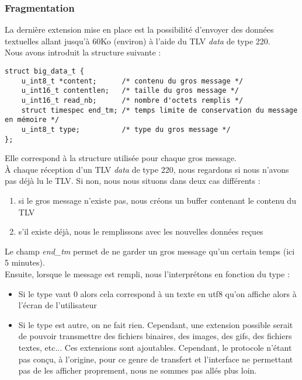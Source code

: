 \documentclass{FR16}
\begin{document}
\subsubsection{Fragmentation}
La dernière extension mise en place est la possibilité d'envoyer des données textuelles allant jusqu'à 60Ko (environ) à l'aide du TLV \textit{data} de type 220.\\
Nous avons introduit la structure suivante :
\begin{verbatim}
struct big_data_t {
    u_int8_t *content;      /* contenu du gros message */
    u_int16_t contentlen;   /* taille du gros message */
    u_int16_t read_nb;      /* nombre d'octets remplis */
    struct timespec end_tm; /* temps limite de conservation du message en mémoire */
    u_int8_t type;          /* type du gros message */
};
\end{verbatim}
Elle correspond à la structure utilisée pour chaque gros message.\\
À chaque réception d'un TLV \textit{data} de type 220, nous regardons si nous n'avons pas déjà lu le TLV. Si non, nous nous situons dans deux cas différents :
\begin{enumerate}
    \item si le gros message n'existe pas, nous créons un buffer contenant le contenu du TLV
    \item s'il existe déjà, nous le remplissons avec les nouvelles données reçues
\end{enumerate}
Le champ \textit{end\_tm} permet de ne garder un gros message qu'un certain temps (ici 5 minutes).\\
Ensuite, lorsque le message est rempli, nous l'interprétons en fonction du type :
\begin{itemize}
    \item Si le type vaut 0 alors cela correspond à un texte en utf8 qu'on affiche alors à l'écran de l'utilisateur
    \item Si le type est autre, on ne fait rien. Cependant, une extension possible serait de pouvoir transmettre des fichiers binaires, des images, des gifs, des fichiers textes, etc... Ces extensions sont ajoutables. Cependant, le protocole n'étant pas conçu, à l'origine, pour ce genre de transfert et l'interface ne permettant pas de les afficher proprement, nous ne sommes pas allés plus loin.
\end{itemize}

\newpage
\end{document}
